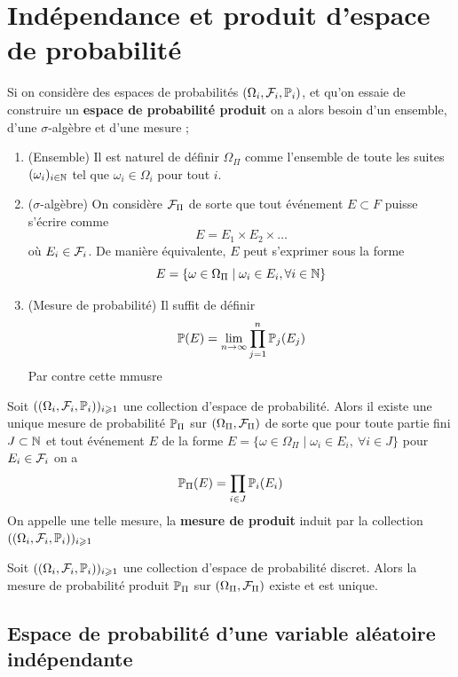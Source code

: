 \section{Indépendance et produit d'espace de probabilité}
Si on considère des espaces de probabilités $(\Omega_i,\F_i, \P_i)$, et qu'on essaie de construire un \textbf{espace de probabilité produit} on a alors besoin d'un ensemble, d'une $\sigma$-algèbre et d'une mesure ;
 \begin{enumerate}
 	\item (Ensemble) Il est naturel de définir $\Omega_\Pi$ comme l'ensemble de toute les suites $(\omega_i)_{i \in \N}$ tel que $\omega_i \in \Omega_i$ pour tout $i$.
 	
 	\item ($\sigma$-algèbre) On considère $\F_\Pi$ de sorte que tout événement $E \subset F$ puisse s'écrire comme 
 	\[
 	E = E_1 \times E_2 \times \ldots
 	\]
 	où $E_i \in \F_i$. De manière équivalente, $E$ peut s'exprimer sous la forme
 	\[
 	E = \{\omega \in \Omega_\Pi \mid \omega_i \in E_i, \forall i \in \N \}
 	\]
 	\item (Mesure de probabilité) Il suffit de définir
 	\[
 	\P(E) = \lim_{n \to \infty} \prod_{j=1}^n \P_j (E_j)
 	\]
 	Par contre cette mmusre
 \end{enumerate}
\begin{theoreme}
	Soit $((\Omega_i,\F_i, \P_i))_{i \geqslant 1}$ une collection d'espace de probabilité. Alors il existe une unique mesure de probabilité $\P_\Pi$ sur $(\Omega_\Pi, \F_\Pi)$ de sorte que pour toute partie fini $J \subset \N$ et tout événement $E$ de la forme $E = \{ \omega \in \Omega_{\Pi} \mid \omega_i \in E_i, ~\forall i \in J\}$ pour $E_i \in \F_i$ on a
	\[
	\P_{\Pi}(E) =  \prod_{i \in J} \P_i(E_i)
	\]
	On appelle une telle mesure, la \textbf{mesure de produit} induit par la collection $((\Omega_i,\F_i, \P_i))_{i \geqslant 1 }$
\end{theoreme}



\begin{lemme} \label{lem: Existence de la mesure de probabilité produit}
	Soit $((\Omega_i,\F_i, \P_i))_{i \geqslant 1}$ une collection d'espace de probabilité discret. Alors la mesure de probabilité produit $\P_\Pi$ sur $(\Omega_\Pi, \F_\Pi)$ existe et est unique.
\end{lemme}


\subsection{Espace de probabilité d'une variable aléatoire indépendante}

